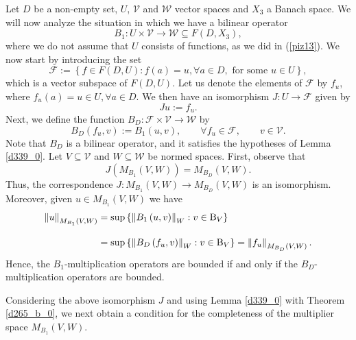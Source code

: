\documentclass[14pt, a4paper]{article}  %
\providecommand{\llave}[1]{\left\lbrace #1\right\rbrace }
\providecommand{\pare}[1]{\left( #1\right) }
\providecommand{\norm}[1]{\left\lVert#1\right\rVert}
\newcommand{\tien}{\rightarrow}
\newcommand{\B}{\textup{B}}
\newcommand{\F}{\mathcal{F}}
\newcommand{\V}{\mathcal{V}}
\newcommand{\W}{\mathcal{W}}
\begin{document}
Let $D$   be a non-empty set,  $U$, $\V$ and $\W$  vector spaces and  $X_{3}$ a  Banach space. We will now analyze the situation in which we have a bilinear operator \begin{equation}\label{lola57}
B_{1}:U\times \V\tien \W\subseteq F\pare{D,X_{3}},
\end{equation}  where we do not assume that $U$ consists of functions, as we did in (\ref{piz13}). We now start by  introducing the set
\begin{equation}
\F:=\llave{f\in F\pare{D,U}:f\pare{a}=u,\forall a\in D,\text{ for some }u\in U},		\end{equation}
which is a vector subspace of $F\pare{D,U}$. Let us denote the elements of $\F$ by  $f_{u}$, where $f_{u}\pare{a}=u\in U,\forall a\in D$.  We then have an isomorphism   $J:U\tien \F$ given by
\begin{equation}
Ju:=f_{u}.
\end{equation} 
Next, we define the function $B_{D}:\F\times \V\tien \W$ by
\begin{equation}
B_{D}\pare{f_{u},v}:=B_{1}\pare{u,v},\qquad \forall f_{u}\in \F,\qquad v\in \V.
\end{equation}
Note that $B_{D}$ is a bilinear operator, and it satisfies the hypotheses of Lemma \ref{d339_0}. Let  $V\subseteq \V$ and $W\subseteq \W$ be normed spaces. First, observe that \begin{equation}
J\pare{M_{B_{1}}\pare{V,W}}=M_{B_{D}}\pare{V,W}.
\end{equation}
Thus, the correspondence $J:M_{B_{1}}\pare{V,W}\tien M_{B_{D}}\pare{V,W}$ is an isomorphism. Moreover, given $u\in M_{B_{1}}\pare{V,W}$ we have
\begin{align}\label{lola55}
\norm{u}_{M_{B_{1}}\pare{V,W}}&=\sup\llave{\norm{B_{1}\pare{u,v}}_{W}:v\in \B_{V}}\nonumber\\[.3 cm]
&=\sup\llave{\norm{B_{D}\pare{f_{u},v}}_{W}:v\in \B_{V}}=\norm{f_{u}}_{M_{B_{D}}\pare{V,W}}.
\end{align}
Hence, the $B_{1}$-multiplication operators are bounded if and only if the $B_{D}$-multiplication operators are bounded.  

Considering the above isomorphism $J$  and using Lemma \ref{d339_0} with Theorem \ref{d265_b_0}, we next obtain a condition for the completeness of the multiplier space $M_{B_{1}}\pare{V,W}$. 
\end{document}
